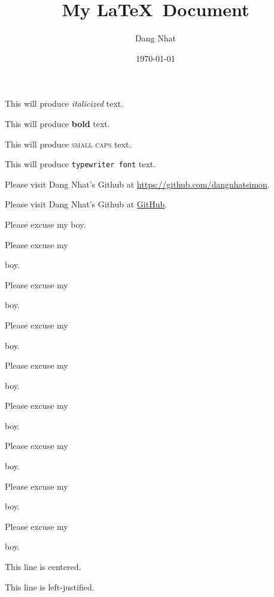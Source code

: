 \documentclass[12pt]{article}
\title{My \LaTeX\ Document}
\author{Dang Nhat}
\date{\today}
\begin{document}
\tableofcontents
\maketitle
This will produce \textit{italicized} text.

This will produce \textbf{bold} text.

This will produce \textsc{small caps} text.

This will produce \texttt{typewriter font} text.

Please visit Dang Nhat's Github at \url{https://github.com/dangnhatsimon}.

Please visit Dang Nhat's Github at \href{https://github.com/dangnhatsimon}{GitHub}.

\vspace{1cm}

Please excuse my boy.

Please excuse my \begin{large}boy.
\end{large}

Please excuse my \begin{Large}boy.
\end{Large}

Please excuse my \begin{huge}boy.
\end{huge}

Please excuse my \begin{Huge}boy.
\end{Huge}

Please excuse my \begin{normalsize}boy.
\end{normalsize}

Please excuse my \begin{small}boy.
\end{small}

Please excuse my \begin{scriptsize}boy.
\end{scriptsize}

Please excuse my \begin{tiny}boy.
\end{tiny}

\vspace{1cm}

\begin{center}
This line is centered.
\end{center}

\begin{flushleft}
This line is left-justified.
\end{flushleft}
\end{document}
